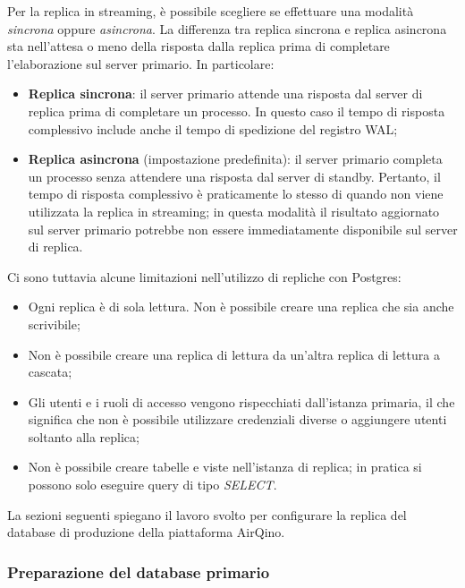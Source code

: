 Per la replica in streaming, è possibile scegliere se effettuare una modalità \textit{sincrona} oppure \textit{asincrona}. La differenza tra replica sincrona e replica asincrona sta nell'attesa o meno della risposta dalla replica prima di completare l'elaborazione sul server primario. In particolare:
\begin{itemize}
  \item \textbf{Replica sincrona}: il server primario attende una risposta dal server di replica prima di completare un processo. In questo caso il tempo di risposta complessivo include anche il tempo di spedizione del registro WAL;
  \item \textbf{Replica asincrona} (impostazione predefinita): il server primario completa un processo senza attendere una risposta dal server di standby. Pertanto, il tempo di risposta complessivo è praticamente lo stesso di quando non viene utilizzata la replica in streaming; in questa modalità il risultato aggiornato sul server primario potrebbe non essere immediatamente disponibile sul server di replica. \cite{streaming_replication}
\end{itemize}

Ci sono tuttavia alcune limitazioni nell'utilizzo di repliche con Postgres:
\begin{itemize}
  \item Ogni replica è di sola lettura. Non è possibile creare una replica che sia anche scrivibile;
  \item Non è possibile creare una replica di lettura da un'altra replica di lettura a cascata;
  \item Gli utenti e i ruoli di accesso vengono rispecchiati dall'istanza primaria, il che significa che non è possibile utilizzare credenziali diverse o aggiungere utenti soltanto alla replica;
  \item Non è possibile creare tabelle e viste nell'istanza di replica; in pratica si possono solo eseguire query di tipo \textit{SELECT}.
\end{itemize}

La sezioni seguenti spiegano il lavoro svolto per configurare la replica del database di produzione della piattaforma AirQino.

\subsubsection{Preparazione del database primario}

